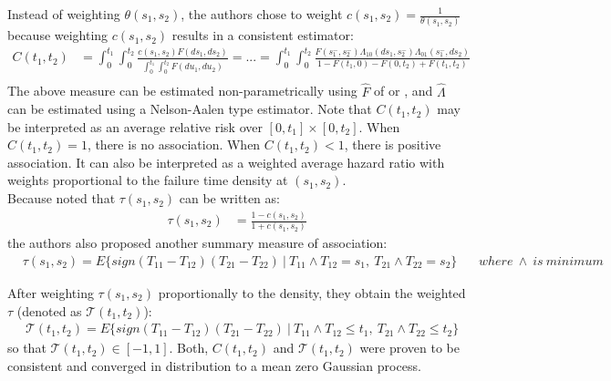\documentclass[]{article}
\begin{document}
Instead of weighting $\theta(s_1, s_2)$, the authors chose to weight $c(s_1, s_2) = \frac{1}{\theta(s_1, s_2)}$ because weighting $c(s_1, s_2)$ results in a consistent estimator:
	$$
	\begin{aligned}
		C(t_1, t_2) &= \int_0^{t_1}\int_0^{t_2} \frac{c(s_1, s_2)F(ds_1,ds_2)}{\int_0^{t_1}\int_0^{t_2} F(du_1, du_2)} = ...= \int_0^{t_1}\int_0^{t_2} \frac{F(s_1^-, s_2^-)\Lambda_{10}(ds_1, s^-_2)\Lambda_{01}(s^-_1, ds_2)}{1 - F(t_1, 0) - F(0, t_2)+ F(t_1, t_2)} \\
	\end{aligned}
	$$
	The above measure can be estimated non-parametrically using $\hat{F}$ of \cite{dabrowska1988kaplan} or \cite{prentice1992covariance}, and $\hat{\Lambda}$ can be estimated using a Nelson-Aalen type estimator.
Note that $C(t_1, t_2)$ may be interpreted as an average relative risk over $[0,t_1] \times [0, t_2]$. When $C(t_1, t_2)=1$, there is no association. When $C(t_1, t_2)<1$, there is positive association. It can also be interpreted as a weighted average hazard ratio with weights proportional to the failure time density at $(s_1,s_2)$.\\
Because \cite{oakes1989bivariate} noted that $\tau(s_1, s_2)$ can be written as:
	$$
	\begin{aligned}
		\tau(s_1, s_2) &= \frac{1 - c(s_1, s_2)}{1+c(s_1, s_2)}
	\end{aligned}
	$$
	the authors also proposed another summary measure of association:
	$$
	\begin{aligned}
		&\tau(s_1, s_2) = E\{sign(T_{11} - T_{12}) (T_{21} - T_{22})~|~ T_{11}\wedge T_{12} = s_1,~T_{21}\wedge T_{22} = s_2  \}
		&~~~~where~\wedge~is~minimum
	\end{aligned}
	$$

After weighting $\tau(s_1, s_2)$ proportionally to the density, they obtain the weighted $\tau$ (denoted as $\mathcal{T}(t_1, t_2)$):
	$$
	\begin{aligned}
		&\mathcal{T}(t_1, t_2) = E\{sign(T_{11} - T_{12}) (T_{21} - T_{22})~|~ T_{11}\wedge T_{12} \leq t_1,~T_{21}\wedge T_{22} \leq t_2  \}
	\end{aligned}
	$$
	so that $\mathcal{T}(t_1, t_2) \in [-1,1]$. Both, $C(t_1, t_2)$ and $\mathcal{T}(t_1, t_2)$ were proven to be consistent and converged in distribution to a mean zero Gaussian process.\\
~\\
\end{document}
